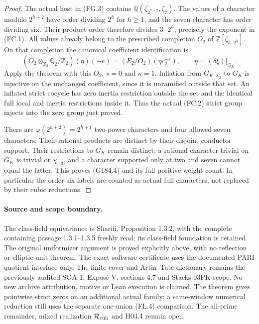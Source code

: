 \begin{proof}
The actual host in (FG.3) contains
$\mathbb Q(\zeta_{2^{h+2}},\zeta_7)$.
The values of a character modulo $2^{h+2}$ have order dividing
$2^h$ for $h\geq1$, and the seven character has order dividing six.
Their product order therefore divides $3\cdot2^h$, precisely the
exponent in (FC.1).  All values already belong to the prescribed
completion $O_2$ of $\mathbb Z[\zeta_{3\cdot2^h}]$.
On that completion the canonical coefficient identification is
\[
 (O_2\otimes_{\mathbb Z_2}\mathbb Q_2/\mathbb Z_2)(\eta)(-e)
                 =(E_2/O_2)(\eta c_2^{-e}),\qquad
                  \eta=(\delta\xi)|_{G_K}.                  \tag{G184.12}
\]
Apply the theorem with this $O_2$, $s=0$ and $\kappa=1$.
Inflation from $G_{K,\Sigma_2}$ to $G_K$ is injective on the
unchanged coefficient, since it is unramified outside that set.
An inflated strict cocycle has zero inertia restriction outside
the set and the identical full local and inertia restrictions
inside it.  Thus the actual (FC.2) strict group injects into
the zero group just proved.

There are $\varphi(2^{h+2})=2^{h+1}$ two-power characters and
four allowed seven characters.  Their rational products are
distinct by their disjoint conductor support.  Their restrictions
to $G_K$ remain distinct: a rational character trivial on $G_K$
is trivial or $\chi_{-3}$, and a character supported only at two
and seven cannot equal the latter.
This proves (G184.4) and its full positive-weight count.
In particular the order-six labels are counted as actual full
characters, not replaced by their cubic reductions.
\end{proof}

\paragraph{Source and scope boundary.}
The class-field equivariance is Sharifi, Proposition 1.3.2, with
the complete containing passage 1.3.1--1.3.5 freshly read; its
class-field foundation is retained.  The original uniformizer
argument is proved explicitly above, with no reflection or
elliptic-unit theorem.  The exact software certificate uses the
documented PARI quotient interface only.
The finite-cover and Artin--Tate dictionary remains the previously
audited SGA 1, Expos\'e V, sections 4,7 and Stacks 03PK scope.
No new archive attribution, motive or Lean execution is claimed.
The theorem gives pointwise strict zeros on an additional actual
family; a same-window numerical reduction still uses the separate
one-union (FL.4) comparison.  The all-prime remainder, mixed
realization $\mathcal R_{\rm cub}$ and H04.4 remain open.
